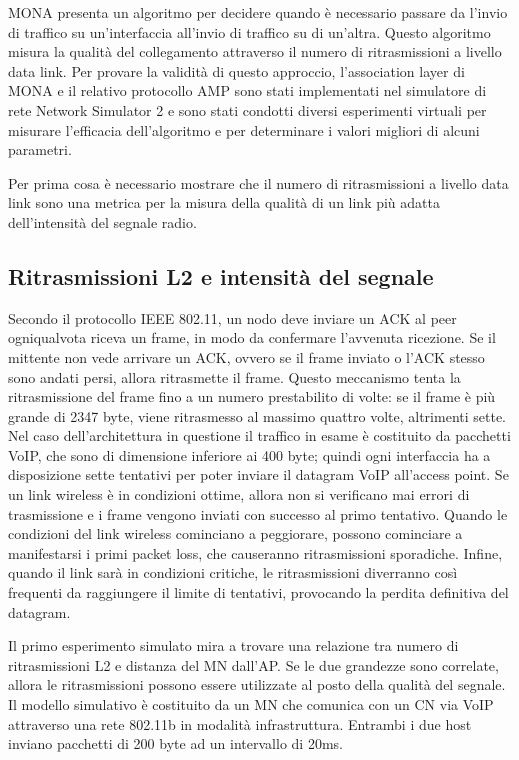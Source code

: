 \documentclass[12pt,a4paper,openright,twoside,draft]{book}
\begin{document}
MONA presenta un algoritmo per decidere quando è necessario passare
da l'invio di traffico su un'interfaccia all'invio di traffico su di
un'altra. Questo algoritmo misura la qualità del collegamento
attraverso il numero di ritrasmissioni a livello data link. Per
provare la validità di questo approccio, l'association layer di MONA e
il relativo protocollo AMP sono stati implementati nel simulatore di
rete Network Simulator 2 e sono stati condotti diversi esperimenti
virtuali per misurare l'efficacia dell'algoritmo e per determinare i
valori migliori di alcuni parametri.

Per prima cosa è necessario mostrare che il numero di ritrasmissioni a
livello data link sono una metrica per la misura della qualità di un
link più adatta dell'intensità del segnale radio.

\subsection{Ritrasmissioni L2 e intensità del segnale}

Secondo il protocollo IEEE 802.11, un nodo deve inviare un ACK al peer
ogniqualvota riceva un frame, in modo da confermare l'avvenuta
ricezione. Se il mittente non vede arrivare un ACK, ovvero se il frame
inviato o l'ACK stesso sono andati persi, allora ritrasmette il
frame. Questo meccanismo tenta la ritrasmissione del frame fino a un
numero prestabilito di volte: se il frame è più grande di 2347 byte,
viene ritrasmesso al massimo quattro volte, altrimenti sette. Nel caso
dell'architettura in questione il traffico in esame è costituito da
pacchetti VoIP, che sono di dimensione inferiore ai 400 byte; quindi
ogni interfaccia ha a disposizione sette tentativi per poter inviare
il datagram VoIP all'access point. Se un link wireless è in condizioni
ottime, allora non si verificano mai errori di trasmissione e i frame
vengono inviati con successo al primo tentativo. Quando le condizioni
del link wireless cominciano a peggiorare, possono cominciare a
manifestarsi i primi packet loss, che causeranno ritrasmissioni
sporadiche. Infine, quando il link sarà in condizioni critiche, le
ritrasmissioni diverranno così frequenti da raggiungere il limite di
tentativi, provocando la perdita definitiva del datagram.

Il primo esperimento simulato mira a trovare una relazione tra numero
di ritrasmissioni L2 e distanza del MN dall'AP. Se le due grandezze
sono correlate, allora le ritrasmissioni possono essere utilizzate al
posto della qualità del segnale. Il modello simulativo è costituito da
un MN che comunica con un CN via VoIP attraverso una rete 802.11b in
modalità infrastruttura. Entrambi i due host inviano pacchetti di 200
byte ad un intervallo di 20ms.
\end{document}
